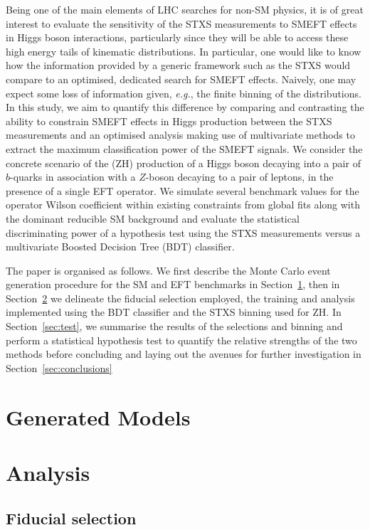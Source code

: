 \documentclass[11pt]{cernrep}
\begin{document}
Being one of the main elements of LHC searches for non-SM physics, it is of great interest to evaluate the sensitivity of the STXS measurements to SMEFT effects in Higgs boson interactions, particularly since they will be able to access these high energy tails of kinematic distributions. In particular, one would like to know how the information provided by a generic framework such as the STXS would compare to an optimised, dedicated search for SMEFT effects. Naively, one may expect some loss of information given, \emph{e.g.}, the finite binning of the distributions. In this study, we aim to quantify this difference by comparing and contrasting the ability to constrain SMEFT effects in Higgs production between the STXS measurements and an optimised analysis making use of multivariate methods to extract the maximum classification power of the SMEFT signals. We consider the concrete scenario of the (ZH) production of a Higgs boson decaying into a pair of $b$-quarks in association with a $Z$-boson  decaying to a pair of leptons, in the presence of a single EFT operator. We simulate several benchmark values for the operator Wilson coefficient within existing constraints from global fits along with the dominant reducible SM background and evaluate the statistical discriminating power of a hypothesis test using the STXS measurements versus a multivariate Boosted Decision Tree (BDT) classifier.

The paper is organised as follows. We first describe the Monte Carlo event generation procedure for the SM and EFT benchmarks in Section~\ref{sec:gen}, then in Section~\ref{sec:tools} we delineate the fiducial selection employed, the training and analysis implemented using the BDT classifier and the STXS binning used for ZH. In Section~\ref{sec:test}, we summarise the results of the selections and binning and perform a statistical hypothesis test to quantify the relative strengths of the two methods before concluding and laying out the avenues for further investigation in Section~\ref{sec:conclusions}

\section{Generated Models} 
\label{sec:gen}
%


\section{Analysis}
\label{sec:tools}
\subsection{Fiducial selection}
\label{sec:fiducial}

\end{document}
